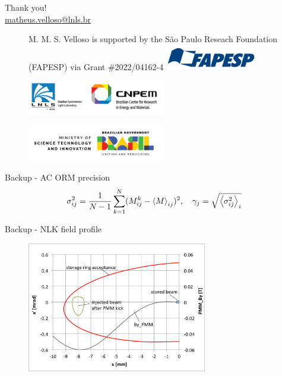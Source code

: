 \documentclass[aspectratio=169]{beamer}
\begin{document}
\begin{frame}
    Thank you!\\
    \vfill
    \url{matheus.velloso@lnls.br}\\
    \vfill
    \begin{figure}
        \centering
        \scriptsize
        M. M. S. Velloso is supported by the São Paulo Reseach Foundation (FAPESP) via Grant \#2022/04162-4
        \includegraphics[width=4cm]{fapesp.png}
    \end{figure}
    \begin{minipage}{0.49\textwidth}
        \begin{figure}
            \includegraphics[width=6cm]{cnpem_lnls.png}
        \end{figure}
    \end{minipage}
    \begin{minipage}{0.49\textwidth}
        \begin{figure}
            \includegraphics[width=6cm]{mcti.png}
        \end{figure}
    \end{minipage}
    \vfill
\end{frame}
\begin{frame}[noframenumbering]{Backup - AC ORM precision}
    \begin{equation*}
        \sigma_{ij}^2 = \frac{1}{N-1}\sum_{k=1}^{N}(M_{ij}^k - \ev{M}_{ij})^2, \quad
        \gamma_j = \sqrt{\ev{\sigma_{ij}^2}_i}
    \end{equation*}
\end{frame}
\begin{frame}[noframenumbering]{Backup - NLK field profile}
    \begin{figure}
        \centering
        \includegraphics[width=0.7\textwidth]{nlk_phase_space.png}
    \end{figure}
\end{frame}
\end{document}
